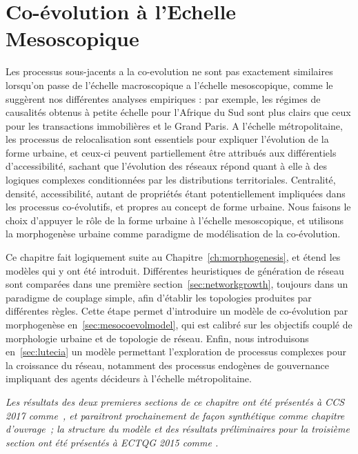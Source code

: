 

\chapter{Co-évolution à l'Echelle Mesoscopique}


\label{ch:mesocoevolution} 




Les processus sous-jacents a la co-evolution ne sont pas exactement similaires lorsqu'on passe de l'échelle macroscopique a l'échelle mesoscopique, comme le suggèrent nos différentes analyses empiriques : par exemple, les régimes de causalités obtenus à petite échelle pour l'Afrique du Sud sont plus clairs que ceux pour les transactions immobilières et le Grand Paris. A l'échelle métropolitaine, les processus de relocalisation sont essentiels pour expliquer l'évolution de la forme urbaine, et ceux-ci peuvent partiellement être attribués aux différentiels d'accessibilité, sachant que l'évolution des réseaux répond quant à elle à des logiques complexes conditionnées par les distributions territoriales. Centralité, densité, accessibilité, autant de propriétés étant potentiellement impliquées dans les processus co-évolutifs, et propres au concept de forme urbaine. Nous faisons le choix d'appuyer le rôle de la forme urbaine à l'échelle mesoscopique, et utilisons la morphogenèse urbaine comme paradigme de modélisation de la co-évolution.


Ce chapitre fait logiquement suite au Chapitre~\ref{ch:morphogenesis}, et étend les modèles qui y ont été introduit. Différentes heuristiques de génération de réseau sont comparées dans une première section~\ref{sec:networkgrowth}, toujours dans un paradigme de couplage simple, afin d'établir les topologies produites par différentes règles. Cette étape permet d'introduire un modèle de co-évolution par morphogenèse en~\ref{sec:mesocoevolmodel}, qui est calibré sur les objectifs couplé de morphologie urbaine et de topologie de réseau. Enfin, nous introduisons en~\ref{sec:lutecia} un modèle permettant l'exploration de processus complexes pour la croissance du réseau, notamment des processus endogènes de gouvernance impliquant des agents décideurs à l'échelle métropolitaine.




\stars


\textit{Les résultats des deux premieres sections de ce chapitre ont été présentés à CCS 2017 comme~\cite{raimbault:halshs-01590624}, et paraitront prochainement de façon synthétique comme chapitre d'ouvrage~\cite{}; la structure du modèle et des résultats préliminaires pour la troisième section ont été présentés à ECTQG 2015 comme \cite{le2015modeling}.}






